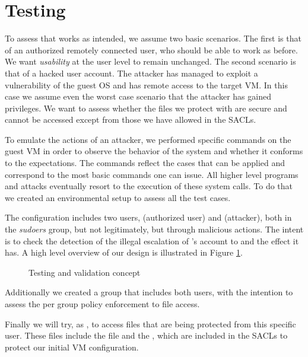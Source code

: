 \section{Testing}\label{sec:testing}

\par To assess that  works as intended, we assume two basic scenarios. The first is that of an authorized remotely connected user, who should be able to work as before. We want \emph{usability} at the user level to remain unchanged. The second scenario is that of a hacked user account. The attacker has managed to exploit a vulnerability of the guest \ac{OS} and has remote access to the target \ac{VM}. In this case we assume even the worst case scenario that the attacker has gained  privileges. We want to assess whether the files we protect with  are secure and cannot be accessed except from those we have allowed in the \acp{SACL}.

\par To emulate the actions of an attacker, we performed specific commands on the guest \ac{VM} in order to observe the behavior of the system and whether it conforms to the expectations. The commands reflect the cases that  can be applied and correspond to the most basic commands one can issue. All higher level programs and attacks eventually resort to the execution of these system calls. To do that we created an environmental setup to assess all the test cases. 

\par The configuration includes two users,  (authorized user) and  (attacker), both in the \emph{sudoers} group, but  not legitimately, but through malicious actions. The intent is to check the detection of the illegal escalation of 's account to  and the effect it has. A high level overview of our design is illustrated in Figure \ref{fig:attack}. 

\begin{figure}[ht]
	\centering
	
	\caption{Testing and validation concept}
	\label{fig:attack}
\end{figure}


\par Additionally we created a group that includes both users, with the intention to assess the per group policy enforcement to file access. 

\par Finally we will try, as , to access files that are being protected from this specific user. These files include the  file and the , which are included in the \acp{SACL} to protect our initial \ac{VM} configuration.

